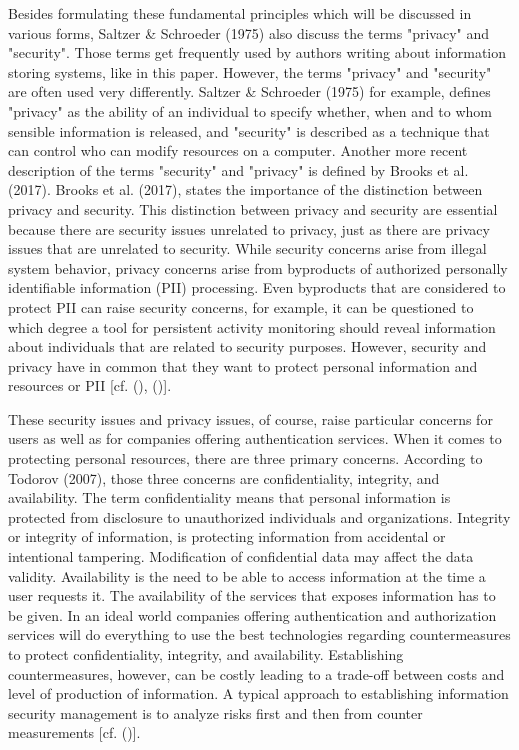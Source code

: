Besides formulating these fundamental principles which will be discussed in various forms,  Saltzer \& Schroeder (1975) also discuss the terms "privacy" and "security". Those terms get frequently used by authors writing about information storing systems, like in this paper. However, the terms "privacy" and "security" are often used very differently.  Saltzer \& Schroeder (1975) for example, defines "privacy" as the ability of an individual to specify whether, when and to whom sensible information is released, and "security" is described as a technique that can control who can modify resources on a computer. Another more recent description of the terms "security" and "privacy" is defined by Brooks et al. (2017). Brooks et al. (2017), states the importance of the distinction between privacy and security. This distinction between privacy and security are essential because there are security issues unrelated to privacy, just as there are privacy issues that are unrelated to security. While security concerns arise from illegal system behavior, privacy concerns arise from byproducts of authorized personally identifiable information (PII) processing. Even byproducts that are considered to protect PII can raise security concerns, for example, it can be questioned to which degree a tool for persistent activity monitoring should reveal information about individuals that are related to security purposes. However, security and privacy have in common that they want to protect personal information and resources or PII [cf. (\cite{Brooks:2017:IPE}), (\cite{Saltzer:PICS})].

These security issues and privacy issues, of course, raise particular concerns for users as well as for companies offering authentication services. When it comes to protecting personal resources, there are three primary concerns. According to Todorov (2007), those three concerns are confidentiality, integrity, and availability. The term confidentiality means that personal information is protected from disclosure to unauthorized individuals and organizations. Integrity or integrity of information, is protecting information from accidental or intentional tampering. Modification of confidential data may affect the data validity. Availability is the need to be able to access information at the time a user requests it. The availability of the services that exposes information has to be given. In an ideal world companies offering authentication and authorization services will do everything to use the best technologies regarding countermeasures to protect confidentiality, integrity, and availability. Establishing countermeasures, however, can be costly leading to a trade-off between costs and level of production of information. A typical approach to establishing information security management is to analyze risks first and then from counter measurements [cf. (\cite{Todorov:2007:MUI})]. 


